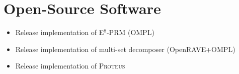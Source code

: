 \section{Open-Source Software}

\begin{itemize}
\item Release implementation of E$^8$-PRM (OMPL) 
\item Release implementation of multi-set decomposer (OpenRAVE+OMPL)
\item Release implementation of \textsc{Proteus}
\end{itemize}

